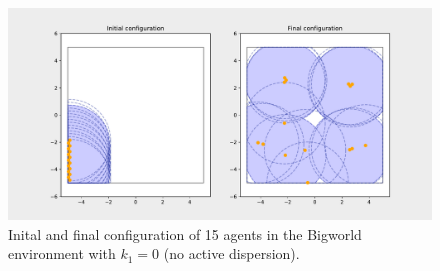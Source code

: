 \begin{figure}[H]
  \centering
  \includegraphics[width=\textwidth]{figs/bigworld_15_agnt_k_1_0_k_2_1_distr.pdf}
  \caption{Inital and final configuration of 15 agents in the Bigworld environment with $k_{1} = 0$ (no active dispersion).}
  \label{fig:15_agnt_bw_k_1_0_k_2_1_distr}
\end{figure}
